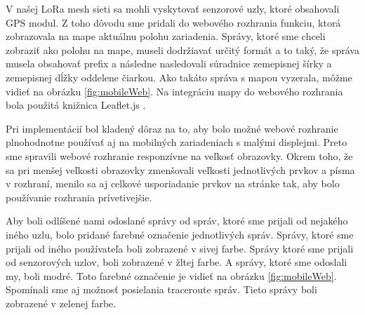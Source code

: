 \documentclass[slovak,master]{diploma}
\begin{document}
V našej LoRa mesh sieti sa mohli vyskytovať senzorové uzly, ktoré obsahovali GPS modul. Z toho dôvodu sme pridali do webového rozhrania funkciu, 
ktorá zobrazovala na mape aktuálnu polohu zariadenia. Správy, ktoré sme chceli zobraziť ako polohu na mape, museli dodržiavať určitý formát 
a to taký, že správa musela obsahovať prefix  a následne nasledovali súradnice zemepisnej šírky a zemepisnej dĺžky oddelene čiarkou.
Ako takáto správa s mapou vyzerala, môžme vidieť na obrázku \ref{fig:mobileWeb}. Na integráciu mapy do webového rozhrania bola použitá knižnica Leaflet.js \cite{leaflet}.

Pri implementácií bol kladený dôraz na to, aby bolo možné webové rozhranie plnohodnotne používať aj na mobilných zariadeniach s malými displejmi. Preto sme 
spravili webové rozhranie responzívne na veľkosť obrazovky. Okrem toho, že sa pri menšej veľkosti obrazovky zmenšovali veľkosti jednotlivých prvkov a písma v rozhraní, 
menilo sa aj celkové usporiadanie prvkov na stránke tak, aby bolo používanie rozhrania prívetivejšie. 

Aby boli odlíšené nami odoslané správy od správ, ktoré sme prijali od nejakého iného uzlu, bolo pridané farebné označenie jednotlivých správ. Správy, ktoré sme 
prijali od iného používateľa boli zobrazené v sivej farbe. Správy ktoré sme prijali od senzorových uzlov, boli zobrazené v žltej farbe. A správy, ktoré sme odoslali 
my, boli modré. Toto farebné označenie je vidieť na obrázku \ref{fig:mobileWeb}. Spomínali sme aj možnosť posielania traceroute správ. Tieto správy boli zobrazené v zelenej farbe.
\end{document}
